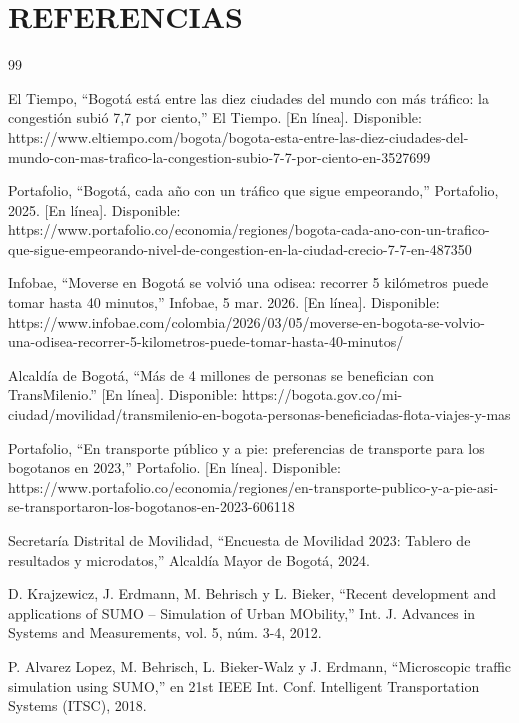 \section{REFERENCIAS}

\begin{thebibliography}{99}
\setlength{\itemsep}{2pt}

 El Tiempo, ``Bogotá está entre las diez ciudades del mundo con más tráfico: la congestión subió 7,7 por ciento,'' El Tiempo. [En línea]. Disponible: https://www.eltiempo.com/bogota/bogota-esta-entre-las-diez-ciudades-del-mundo-con-mas-trafico-la-congestion-subio-7-7-por-ciento-en-3527699

 Portafolio, ``Bogotá, cada año con un tráfico que sigue empeorando,'' Portafolio, 2025. [En línea]. Disponible: https://www.portafolio.co/economia/regiones/bogota-cada-ano-con-un-trafico-que-sigue-empeorando-nivel-de-congestion-en-la-ciudad-crecio-7-7-en-487350

 Infobae, ``Moverse en Bogotá se volvió una odisea: recorrer 5 kilómetros puede tomar hasta 40 minutos,'' Infobae, 5 mar. 2026. [En línea]. Disponible: https://www.infobae.com/colombia/2026/03/05/moverse-en-bogota-se-volvio-una-odisea-recorrer-5-kilometros-puede-tomar-hasta-40-minutos/

 Alcaldía de Bogotá, ``Más de 4 millones de personas se benefician con TransMilenio.'' [En línea]. Disponible: https://bogota.gov.co/mi-ciudad/movilidad/transmilenio-en-bogota-personas-beneficiadas-flota-viajes-y-mas

 Portafolio, ``En transporte público y a pie: preferencias de transporte para los bogotanos en 2023,'' Portafolio. [En línea]. Disponible: https://www.portafolio.co/economia/regiones/en-transporte-publico-y-a-pie-asi-se-transportaron-los-bogotanos-en-2023-606118

 Secretaría Distrital de Movilidad, ``Encuesta de Movilidad 2023: Tablero de resultados y microdatos,'' Alcaldía Mayor de Bogotá, 2024.

 D. Krajzewicz, J. Erdmann, M. Behrisch y L. Bieker, ``Recent development and applications of SUMO -- Simulation of Urban MObility,'' Int. J. Advances in Systems and Measurements, vol. 5, núm. 3-4, 2012.

 P. Alvarez Lopez, M. Behrisch, L. Bieker-Walz y J. Erdmann, ``Microscopic traffic simulation using SUMO,'' en 21st IEEE Int. Conf. Intelligent Transportation Systems (ITSC), 2018.


\end{thebibliography}
